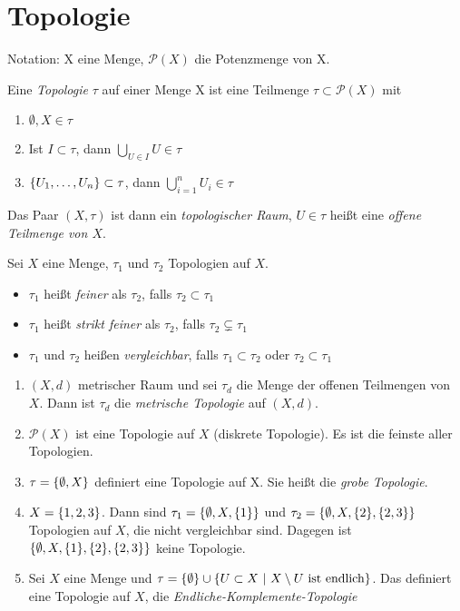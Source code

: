 \section{Topologie}

Notation: X eine Menge, $\mathcal{P}(X)$ die Potenzmenge von X.

\begin{dfn}
    Eine \emph{Topologie} $\tau$ auf einer Menge X ist eine Teilmenge
    $\tau\subset\mathcal{P}(X)$ mit
    \begin{enumerate}
        \item $\emptyset, X \in \tau$
        \item Ist $I\subset \tau$, dann $\bigcup_{U\in I} U \in\tau$
        \item $\mdef{U_1, \ldots, U_n} \subset \tau$, dann
            $\bigcup_{i=1}^n U_i \in \tau$
    \end{enumerate}
    Das Paar $(X, \tau)$ ist dann ein \emph{topologischer Raum}, $U\in\tau$ heißt
    eine \emph{offene Teilmenge von $X$}.
\end{dfn}

\begin{dfn}
    Sei $X$ eine Menge, $\tau_1$ und $\tau_2$ Topologien auf $X$.
    \begin{itemize}
        \item $\tau_1$ heißt \emph{feiner} als $\tau_2$, falls $\tau_2\subset\tau_1$
        \item $\tau_1$ heißt \emph{strikt feiner} als $\tau_2$, falls
            $\tau_2\subsetneq\tau_1$
        \item $\tau_1$ und $\tau_2$ heißen \emph{vergleichbar}, falls
            $\tau_1\subset\tau_2$ oder $\tau_2\subset\tau_1$
    \end{itemize}
\end{dfn}

\begin{bsps}
    \begin{enumerate}
        \item $(X,d)$ metrischer Raum und sei $\tau_d$ die Menge der offenen
            Teilmengen von $X$. Dann ist $\tau_d$ die \emph{metrische Topologie}
            auf $(X,d)$.
        \item $\mathcal{P}(X)$ ist eine Topologie auf $X$ (diskrete Topologie). Es
            ist die feinste aller Topologien.
        \item $\tau = \mdef{\emptyset, X}$ definiert eine Topologie auf X. Sie
            heißt die \emph{grobe Topologie}.
        \item $X=\mdef{1,2,3}$. Dann sind $\tau_1=\mdef{\emptyset,X,\mdef{1}}$ und
            $\tau_2=\mdef{\emptyset, X, \mdef{2}, \mdef{2,3}}$ Topologien auf $X$,
            die nicht vergleichbar sind. Dagegen ist
            $\mdef{\emptyset, X, \mdef{1}, \mdef{2}, \mdef{2,3}}$ keine Topologie.
        \item Sei $X$ eine Menge und
            $\tau = \mdef{\emptyset}\cup\mdef[U\subset X]{X\setminus U \ \text{ist endlich}}$.
            Das definiert eine Topologie auf $X$, die \emph{Endliche-Komplemente-Topologie}
    \end{enumerate}
\end{bsps}

